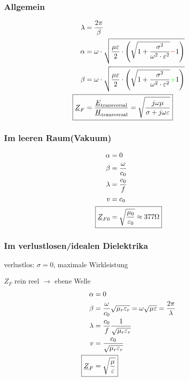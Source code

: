 \subsubsection{Allgemein}
\begin{align*}
    \lambda                 & = \dfrac{2\pi}{\beta}                                                                                                                       \\
    \alpha                  & = \omega \cdot \sqrt{\dfrac{\mu \varepsilon}{2}\cdot \left(\sqrt{1+\dfrac{\sigma^2}{\omega^2\cdot\varepsilon^2}}{\color{red}{-}}1\right)}   \\
    \beta                   & = \omega \cdot \sqrt{\dfrac{\mu \varepsilon}{2}\cdot \left(\sqrt{1+\dfrac{\sigma^2}{\omega^2\cdot\varepsilon^2}}{\color{green}{+}}1\right)} \\
    \Aboxed{\underline{Z}_F & = \dfrac{\underline{E}_\text{transversal}}{\underline{H}_\text{transversal}} = \sqrt{\dfrac{j\omega\mu}{\sigma+j\omega\varepsilon}}}
\end{align*}

\subsubsection{Im leeren Raum(Vakuum)}
\begin{align*}
    \alpha                     & = 0                                                    \\
    \beta                      & = \dfrac{\omega}{c_0}                                  \\
    \lambda                    & = \dfrac{c_0}{f}                                       \\
    v                          & = c_0                                                  \\
    \Aboxed{\underline{Z}_{F0} & = \sqrt{\dfrac{\mu_0}{\varepsilon_0}}\approx377\Omega}
\end{align*}

\subsubsection{Im verlustlosen/idealen Dielektrika}
verlustlos: $\sigma =0$, maximale Wirkleistung 

$Z_F$ rein reel $\rightarrow$ ebene Welle
\begin{align*}
    \alpha                  & = 0                                                                                              \\
    \beta                   & = \dfrac{\omega}{c_0}\sqrt{\mu_r\varepsilon_r}=\omega\sqrt{\mu\varepsilon}=\dfrac{2\pi}{\lambda} \\
    \lambda                 & = \dfrac{c_0}{f}\dfrac{1}{\sqrt{\mu_r\varepsilon_r}}                                             \\
    v                       & = \dfrac{c_0}{\sqrt{\mu_r\varepsilon_r}}                                                         \\
    \Aboxed{\underline{Z}_F & = \sqrt{\dfrac{\mu}{\varepsilon}}}
\end{align*}

